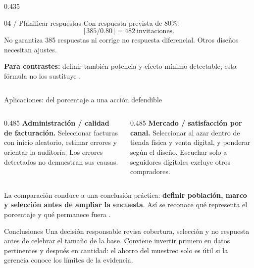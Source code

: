 \documentclass[spanish,final,xcolor={dvipsnames,table}]{beamer}
\begin{document}
\begin{itescaposter}
\begin{columns}[T,totalwidth=\colwidth]
\begin{column}{0.435\colwidth}
\begin{itescaposterpanel}{04 / Planificar respuestas}
Con respuesta prevista de 80\%:
\[
\lceil385/0.80\rceil=\boxed{482}\ \text{invitaciones}.
\]
No garantiza 385 respuestas ni corrige no respuesta diferencial. Otros diseños necesitan ajustes.

\textbf{Para contrastes:} definir también potencia y efecto mínimo detectable; esta fórmula no los sustituye \citep{nistHandbook}.
\end{itescaposterpanel}
\end{column}
\end{columns}

\begin{block}{Aplicaciones: del porcentaje a una acción defendible}
\begin{columns}[T,onlytextwidth]
\begin{column}{0.485\linewidth}
\textbf{Administración / calidad de facturación.} Seleccionar facturas con inicio aleatorio, estimar errores y orientar la auditoría. Los errores detectados no demuestran sus causas.
\end{column}
\begin{column}{0.485\linewidth}
\textbf{Mercado / satisfacción por canal.} Seleccionar al azar dentro de tienda física y venta digital, y ponderar según el diseño. Escuchar solo a seguidores digitales excluye otros compradores.
\end{column}
\end{columns}
\medskip
La comparación conduce a una conclusión práctica: \textbf{definir población, marco y selección antes de ampliar la encuesta}. Así se reconoce qué representa el porcentaje y qué permanece fuera \citep{bradley2021,holmesBusiness2023}.
\end{block}

\begin{block}{Conclusiones}
Una decisión responsable revisa cobertura, selección y no respuesta antes de celebrar el tamaño de la base. Conviene invertir primero en datos pertinentes y después en cantidad: el ahorro del muestreo solo es útil si la gerencia conoce los límites de la evidencia.
\end{block}


\end{itescaposter}
\end{document}
